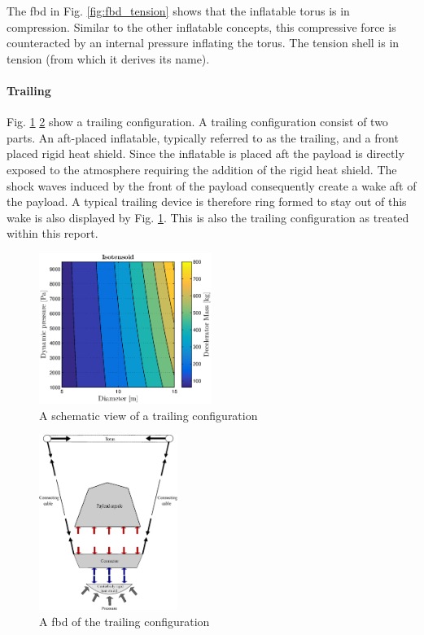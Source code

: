 The \gls{fbd} in Fig. \ref{fig:fbd_tension} shows that the inflatable torus is in compression. Similar to the other inflatable concepts, this compressive force is counteracted by an internal pressure inflating the torus. The tension shell is in tension (from which it derives its name). 

\paragraph{Trailing}

Fig. \ref{fig:conc_trailing} \ref{fig:fbd_trailing} show a trailing configuration. A trailing configuration consist of two parts. An aft-placed inflatable, typically referred to as the trailing, and a front placed rigid heat shield. Since the inflatable is placed aft the payload is directly exposed to the atmosphere requiring the addition of the rigid heat shield. The shock waves induced by the front of the payload consequently create a wake aft of the payload. A typical trailing device is therefore ring formed to stay out of this wake is also displayed by Fig. \ref{fig:conc_trailing}. This is also the trailing configuration as treated within this report.

\begin{figure}[H]
\centering
\includegraphics[width = 0.5\textwidth]{Figure/ISO_comp.eps}
\caption{A schematic view of a trailing configuration}
\label{fig:conc_trailing}
\end{figure}

\begin{figure}[H]
\centering
\includegraphics[width = 0.4\textwidth]{Figure/FBD_trailing.eps}
\caption{A \gls{fbd} of the trailing configuration}
\label{fig:fbd_trailing}
\end{figure}

